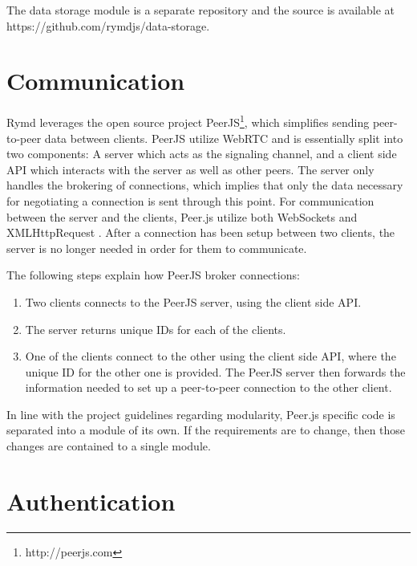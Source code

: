 The data storage module is a separate repository and the source is available at https://github.com/rymdjs/data-storage.

\section{Communication}
\label{sec:p2p}

Rymd leverages the open source project PeerJS\footnote{http://peerjs.com}, which simplifies sending peer-to-peer data between clients. PeerJS utilize WebRTC and is essentially split into two components: A server which acts as the signaling channel, and a client side API which interacts with the server as well as other peers. The server only handles the brokering of connections, which implies that only the data necessary for negotiating a connection is sent through this point. For communication between the server and the clients, Peer.js utilize both WebSockets and XMLHttpRequest \cite{PeerjsGithub:2014:Online}. After a connection has been setup between two clients, the server is no longer needed in order for them to communicate.

The following steps explain how PeerJS broker connections:
\begin{enumerate}
\item Two clients connects to the PeerJS server, using the client side API.
\item The server returns unique IDs for each of the clients.
\item One of the clients connect to the other using the client side API, where the unique ID for the other one is provided. The PeerJS server then forwards the information needed to set up a peer-to-peer connection to the other client.
\end{enumerate}
In line with the project guidelines regarding modularity, Peer.js specific code is separated into a module of its own. If the requirements are to change, then those changes are contained to a single module.


\section{Authentication}


